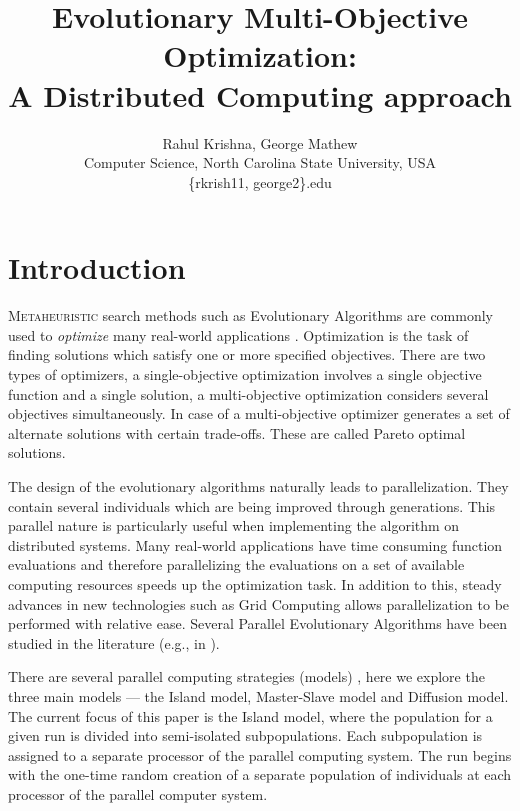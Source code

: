 \documentclass[conference]{IEEEtran}
\author{Rahul Krishna, George Mathew\\
	Computer Science, North Carolina State University, USA\\
	\{rkrish11, george2\}\@ncsu.edu
}
\title{Evolutionary Multi-Objective Optimization:\\ A Distributed Computing approach}
\begin{document}
	\maketitle
	\begin{abstract}

	\end{abstract}
	\begin{IEEEkeywords}

	\end{IEEEkeywords}
	
	\section{Introduction} 

\lettrine{M}{etaheuristic} search methods such as Evolutionary Algorithms are commonly used to \textit{optimize} many real-world applications \cite{goldberg1989genetic,storn97}. Optimization is the task of finding solutions which satisfy one or more specified objectives. There are two types of optimizers, a single-objective optimization involves a single objective function and a single solution, a multi-objective optimization considers several objectives simultaneously. In case of a multi-objective optimizer generates a set of alternate solutions with certain trade-offs. These are called Pareto optimal solutions. 

The design of the evolutionary algorithms naturally leads to parallelization. They contain several individuals which are being improved through generations. This parallel nature is particularly useful when implementing the algorithm on distributed systems. Many real-world applications have time consuming function evaluations and therefore parallelizing the evaluations on a set of available computing resources speeds up the optimization task. In addition to this, steady advances in new technologies such as Grid Computing \cite{xx} allows parallelization to be performed with relative ease. Several Parallel Evolutionary Algorithms have been studied in the literature (e.g., in \cite{xx}). 

There are several parallel computing strategies (models) \cite{08parallel}, here we explore the three main models --- the Island model, Master-Slave model and Diffusion model. The current focus of this paper is the Island model, where the population for a given run is divided into semi-isolated subpopulations. Each subpopulation is assigned to a separate processor of the parallel computing system. The run begins with the one-time random creation of a separate population of individuals at each processor of the parallel computer system.
\end{document}
